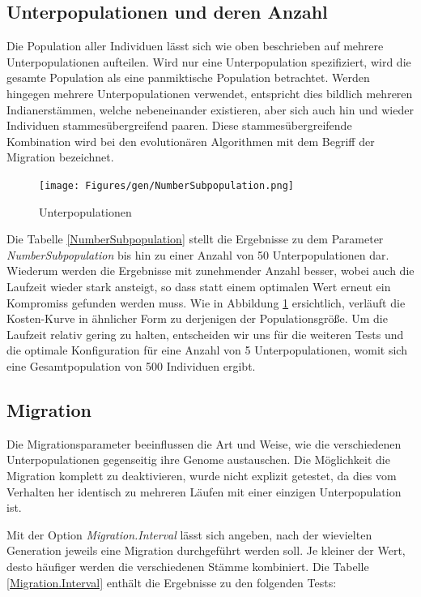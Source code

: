 \subsection{Unterpopulationen und deren Anzahl}
Die Population aller Individuen
lässt sich wie oben beschrieben auf mehrere Unterpopulationen aufteilen.
Wird nur eine Unterpopulation spezifiziert, wird die gesamte Population als
eine panmiktische Population betrachtet. Werden hingegen mehrere Unterpopulationen
verwendet, entspricht dies bildlich mehreren Indianerstämmen, welche nebeneinander
existieren, aber sich auch hin und wieder Individuen stammesübergreifend paaren.
Diese stammesübergreifende Kombination wird bei den evolutionären Algorithmen
mit dem Begriff der Migration bezeichnet.



\begin{figure}[h!]
  \centering
  \texttt{[image: Figures/gen/NumberSubpopulation.png]}
  \caption{Unterpopulationen}\label{fig.numbersubpopulation}
\end{figure}

Die Tabelle \ref{NumberSubpopulation} stellt die Ergebnisse zu dem Parameter
\emph{NumberSubpopulation} bis hin zu einer Anzahl von 50 Unterpopulationen dar.
Wiederum werden die Ergebnisse mit zunehmender Anzahl besser, wobei auch
die Laufzeit wieder stark ansteigt, so dass statt einem optimalen Wert erneut
ein Kompromiss gefunden werden muss.
Wie in Abbildung \ref{fig.numbersubpopulation} ersichtlich, verläuft die
Kosten-Kurve in ähnlicher Form zu derjenigen der Populationsgröße. Um die
Laufzeit relativ gering zu halten, entscheiden wir uns für die weiteren Tests
und die optimale Konfiguration für eine Anzahl von 5 Unterpopulationen, womit
sich eine Gesamtpopulation von 500 Individuen ergibt.


\subsection{Migration}
Die Migrationsparameter beeinflussen die Art und Weise,
wie die verschiedenen Unterpopulationen gegenseitig ihre Genome austauschen.
Die Möglichkeit die Migration komplett zu deaktivieren, wurde nicht explizit
getestet, da dies vom Verhalten her identisch zu mehreren Läufen mit einer
einzigen Unterpopulation ist.


Mit der Option \emph{Migration.Interval} lässt sich angeben, nach der wievielten
Generation jeweils eine Migration durchgeführt werden soll. Je kleiner der Wert,
desto häufiger werden die verschiedenen Stämme kombiniert. Die Tabelle
\ref{Migration.Interval} enthält die Ergebnisse zu den folgenden Tests:

